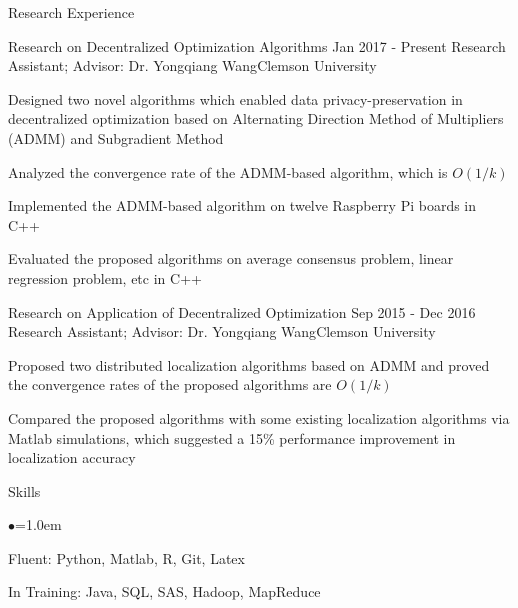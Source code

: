 \documentclass{resume} %
\begin{document}

\begin{rSection}{Research Experience}	
\begin{rSubsection}{Research on Decentralized Optimization Algorithms }
{Jan 2017 - Present }{Research Assistant; Advisor: Dr. Yongqiang Wang}{Clemson University}

 \setlength{\parindent}{2em}
 \item Designed two novel algorithms which enabled data privacy-preservation in decentralized optimization based on Alternating Direction Method of Multipliers (ADMM) and Subgradient Method
\item Analyzed the convergence rate of the ADMM-based algorithm, which is $O(1/k)$
\item Implemented the ADMM-based algorithm on twelve Raspberry Pi boards in C++
\item Evaluated the proposed algorithms on average consensus problem, linear regression problem, etc in C++
\end{rSubsection}	
		

\begin{rSubsection}{Research on Application of Decentralized Optimization}{ Sep 2015 - Dec 2016  }{Research Assistant; Advisor: Dr. Yongqiang Wang}{Clemson University}
       \item Proposed two distributed localization algorithms based on ADMM and proved the convergence rates of the proposed algorithms are $O(1/k)$
		\item Compared the proposed algorithms with some existing localization algorithms via Matlab simulations, which suggested a 15\% performance improvement in localization accuracy 
\end{rSubsection}
\end{rSection}


\vspace{-0.15cm}
\begin{rSection}{Skills}
  \begin{list}{$\bullet$}{\leftmargin=1.0em}
  	\item Fluent: Python, Matlab, R, Git, Latex 
  	\item In Training: Java, SQL, SAS, Hadoop, MapReduce 
  	\end{list}
\end{rSection}
\end{document}
